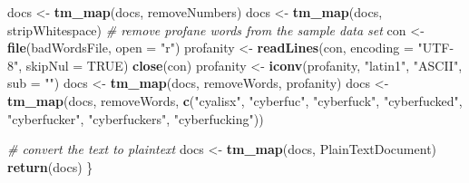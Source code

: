 \documentclass[]{article}
\newenvironment{Shaded}{\begin{snugshade}}{\end{snugshade}}
\newcommand{\CommentTok}[1]{\textcolor[rgb]{0.56,0.35,0.01}{\textit{#1}}}
\newcommand{\DataTypeTok}[1]{\textcolor[rgb]{0.13,0.29,0.53}{#1}}
\newcommand{\KeywordTok}[1]{\textcolor[rgb]{0.13,0.29,0.53}{\textbf{#1}}}
\newcommand{\NormalTok}[1]{#1}
\newcommand{\OtherTok}[1]{\textcolor[rgb]{0.56,0.35,0.01}{#1}}
\newcommand{\StringTok}[1]{\textcolor[rgb]{0.31,0.60,0.02}{#1}}
\begin{document}
\begin{Shaded}
\begin{Highlighting}[]
\NormalTok{  docs <-}\StringTok{ }\KeywordTok{tm_map}\NormalTok{(docs, removeNumbers)}
\NormalTok{  docs <-}\StringTok{ }\KeywordTok{tm_map}\NormalTok{(docs, stripWhitespace)}
  \CommentTok{# remove profane words from the sample data set}
\NormalTok{  con <-}\StringTok{ }\KeywordTok{file}\NormalTok{(badWordsFile, }\DataTypeTok{open =} \StringTok{"r"}\NormalTok{)}
\NormalTok{  profanity <-}\StringTok{ }\KeywordTok{readLines}\NormalTok{(con, }\DataTypeTok{encoding =} \StringTok{"UTF-8"}\NormalTok{, }\DataTypeTok{skipNul =} \OtherTok{TRUE}\NormalTok{)}
  \KeywordTok{close}\NormalTok{(con)}
\NormalTok{  profanity <-}\StringTok{ }\KeywordTok{iconv}\NormalTok{(profanity, }\StringTok{"latin1"}\NormalTok{, }\StringTok{"ASCII"}\NormalTok{, }\DataTypeTok{sub =} \StringTok{""}\NormalTok{)}
\NormalTok{  docs <-}\StringTok{ }\KeywordTok{tm_map}\NormalTok{(docs, removeWords, profanity)}
\NormalTok{  docs <-}\StringTok{ }\KeywordTok{tm_map}\NormalTok{(docs, removeWords, }\KeywordTok{c}\NormalTok{(}\StringTok{"cyalisx"}\NormalTok{,}
                                      \StringTok{"cyberfuc"}\NormalTok{,}
                                      \StringTok{"cyberfuck"}\NormalTok{,}
                                      \StringTok{"cyberfucked"}\NormalTok{,}
                                      \StringTok{"cyberfucker"}\NormalTok{,}
                                      \StringTok{"cyberfuckers"}\NormalTok{,}
                                      \StringTok{"cyberfucking"}\NormalTok{))}
  
  \CommentTok{# convert the text to plaintext}
\NormalTok{  docs <-}\StringTok{ }\KeywordTok{tm_map}\NormalTok{(docs, PlainTextDocument)}
  \KeywordTok{return}\NormalTok{(docs)}
\NormalTok{\}}



\end{Highlighting}
\end{Shaded}
\end{document}
